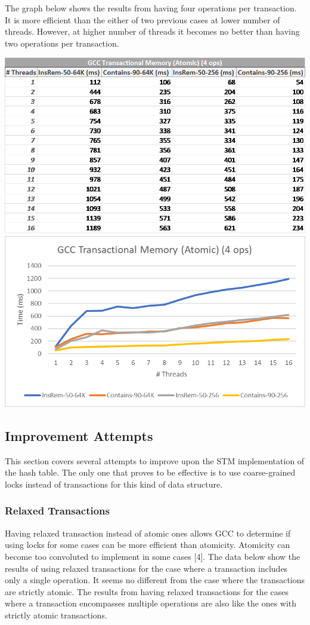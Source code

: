 \documentclass[11pt]{article} %
\begin{document}
The graph below shows the results from having four operations per transaction. It is more efficient than the either of two previous cases at lower number of threads. However, at higher number of threads it becomes no better than having two operations per transaction.

\bigskip
\includegraphics[width=0.5\linewidth]{Table3.png}
\includegraphics[width=0.5\linewidth]{Graph3.png}

\subsection{Improvement Attempts}

This section covers several attempts to improve upon the STM implementation of the hash table. The only one that proves to be effective is to use coarse-grained locks instead of transactions for this kind of data structure.

\subsubsection{Relaxed Transactions}

Having relaxed transaction instead of atomic ones allows GCC to determine if using locks for some cases can be more efficient than atomicity. Atomicity can become too convoluted to implement in some cases [4]. The data below show the results of using relaxed transactions for the case where a transaction includes only a single operation. It seems no different from the case where the transactions are strictly atomic. The results from having relaxed transactions for the cases where a transaction encompasses multiple operations are also like the ones with strictly atomic transactions.
\end{document}
